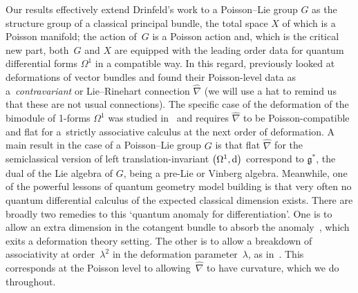 \documentclass[10pt,a4paper]{amsart}
\numberwithin{equation}{section}
\newcommand{\<}{{\langle}}
\renewcommand{\>}{{\rangle}}
\newcommand{\extd}{{\rm d}}
\newcommand{\cg}{{\mathfrak{g}}}
\begin{document}
Our results effectively extend Drinfeld's work to a Poisson--Lie group $G$ as the structure group of a classical principal bundle, the total space $X$ of which is a Poisson manifold; the action of~$G$ is a Poisson action and, which is the critical new part, both~$G$ and $X$ are equipped with the leading order data for quantum differential forms $\Omega^1$ in a compatible way. In this regard, \cite{Bur,Fer,Hue} previously looked at deformations of vector bundles and found their Poisson-level data as a~{\em contravariant} or Lie--Rinehart connection $\hat\nabla$ (we will use a hat to remind us that these are not usual connections). The specific case of the deformation of the bimodule of 1-forms $\Omega^1$ was studied in~\cite{BegMa:sem, BegMa:twi, Haw} and requires $\hat\nabla$ to be Poisson-compatible and flat for a~strictly associative calculus at the next order of deformation. A main result \cite[Corollary~4.2]{MaTao:plg} in the case of a Poisson--Lie group $G$ is that flat $\hat\nabla$ for the semiclassical version of left translation-invariant $\big(\Omega^1,\extd\big)$ correspond to $\cg^*$, the dual of the Lie algebra of $G$, being a pre-Lie or Vinberg algebra. Meanwhile, one of the powerful lessons of quantum geometry model building is that very often no quantum differential calculus of the expected classical dimension exists. There are broadly two remedies to this `quantum anomaly for differentiation'. One is to allow an extra dimension in the cotangent bundle to absorb the anomaly~\cite{Ma:spo,Ma:rec}, which exits a deformation theory setting. The other is to allow a breakdown of associativity at order~$\lambda^2$ in the deformation parameter~$\lambda$, as in~\cite{BegMa:sem, BegMa:twi}. This corresponds at the Poisson level to allowing~$\hat\nabla$ to have curvature, which we do throughout.
\end{document}
